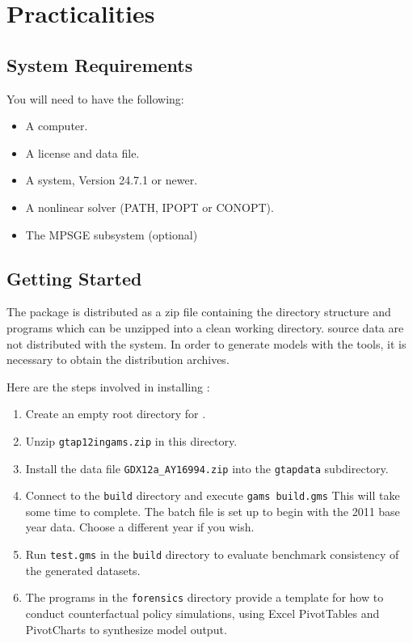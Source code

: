 \section[B]{Practicalities}\label{installation}
\subsection*{System Requirements}

You will need to have the following:

\begin{itemize}
\item{A computer.}
\item{A  license and data file.}
\item{A \GAMS system, Version 24.7.1 or newer.}
\item{A nonlinear solver (PATH, IPOPT or CONOPT).}
\item{The MPSGE subsystem (optional)}
\end{itemize}

\subsection*{Getting Started}

The \GTAPINGAMS package is distributed as a zip file containing the
directory structure and \GAMS programs which can be unzipped into a
clean working directory. \GTAP source data are not distributed with
the \GTAPINGAMS system.  In order to generate models with the
\GTAPINGAMS tools, it is necessary to obtain the  distribution
archives.

Here are the steps involved in installing \GTAPINGAMS:
\begin{enumerate}
\item   Create an empty root directory for \GTAP.
\item   Unzip \texttt{gtap12ingams.zip} in this directory.
\item   Install the \GTAP data file \texttt{GDX12a\_AY16994.zip} into the \texttt{gtapdata}
subdirectory.
\item   Connect to the \texttt{build} directory and execute
\texttt{gams build.gms}  This will take some time to complete.  The batch
file is set up to begin with the 2011 base year data. Choose a different year if you wish.
\item   Run \texttt{test.gms} in the \texttt{build} directory  to
evaluate benchmark consistency of the generated datasets.
\item   The \GAMS programs in the \texttt{forensics} directory provide
a template for how to conduct counterfactual policy simulations, using
Excel PivotTables and PivotCharts to synthesize model output.
\end{enumerate}
